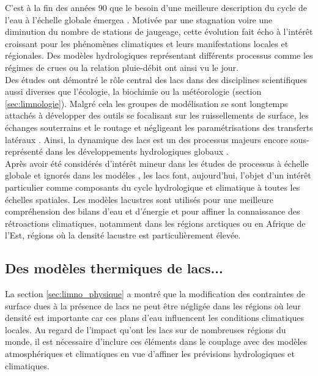 C'est à la fin des années 90 que le besoin d’une meilleure description du cycle de l’eau à l’échelle globale émergea \citep{alsdorf2003}. Motivée par une stagnation voire une diminution du nombre de stations de jaugeage, cette évolution fait écho à l’intérêt croissant pour les phénomènes climatiques et leurs manifestations locales et régionales. Des modèles hydrologiques représentant différents processus comme les régimes de crues \citep[LISFLOOD,][]{de2000} ou la relation pluie-débit \citep{perrin2003} ont ainsi vu le jour. \\
Des études ont démontré le rôle central des lacs dans des disciplines scientifiques aussi diverses que l’écologie, la biochimie ou la météorologie (section \ref{sec:limnologie}). Malgré cela les groupes de modélisation se sont longtemps attachés à développer des outils se focalisant sur les ruissellements de surface, les échanges souterrains et le routage et négligeant les paramétrisations des transferts latéraux \citep{davison2016}. Ainsi, la dynamique des lacs est un des processus majeurs encore sous-représenté dans les développements hydrologiques globaux  \citep{gronewold2020}. \\
Après avoir été considérés d’intérêt mineur dans les études de processus à échelle globale et ignorés dans les modéles \citep{downing2010}, les lacs font, aujourd’hui, l’objet d’un intérêt particulier comme composants du cycle hydrologique et climatique à toutes les échelles spatiales. Les modèles lacustres sont utilisés pour une meilleure compréhension des bilans d’eau et d'énergie et pour affiner la connaissance des rétroactions climatiques, notamment dans les régions arctiques ou en Afrique de l'Est, régions où la densité lacustre est particulièrement élevée. 

\subsection{{\selectfont Des modèles thermiques de lacs...}}

La section \ref{sec:limno_physique} a montré que la modification des contraintes de surface dues à la présence de lacs ne peut être négligée dans les régions où leur densité est importante car ces plans d'eau influencent les conditions climatiques locales. Au regard de l’impact qu’ont les lacs sur de nombreuses régions du monde, il est nécessaire d’inclure ces éléments dans le couplage avec des modèles atmosphériques et climatiques en vue d’affiner les prévisions hydrologiques et climatiques.\\

